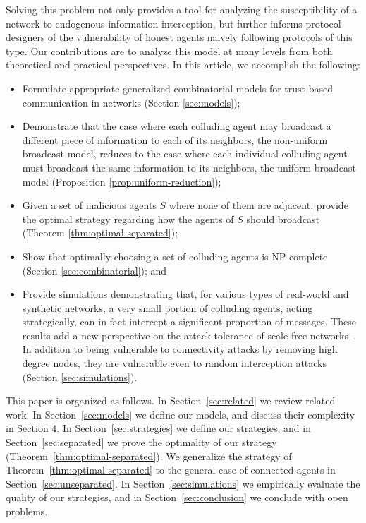 \documentclass{comnet}
\begin{document}
Solving this problem not only provides a tool for analyzing the susceptibility
of a network to endogenous information interception, but further informs
protocol designers of the vulnerability of honest agents naively following
protocols of this type. Our contributions are to analyze this model at many
levels from both theoretical and practical perspectives. In this article, we
accomplish the following:

\begin{itemize}
\item Formulate appropriate generalized combinatorial models for trust-based
communication in networks (Section \ref{sec:models});

\item Demonstrate that the case where each colluding agent may broadcast a
different piece of information to each of its neighbors, the non-uniform
broadcast model, reduces to the case where each individual colluding agent must
broadcast the same information to its neighbors, the uniform broadcast model
(Proposition \ref{prop:uniform-reduction});

\item Given a set of malicious agents $S$ where none of them are adjacent,
provide the optimal strategy regarding how the agents of $S$ should broadcast
(Theorem \ref{thm:optimal-separated});

\item Show that optimally choosing a set of colluding agents is NP-complete
(Section \ref{sec:combinatorial}); and 

\item Provide simulations demonstrating that, for various types of real-world
and synthetic networks, a very small portion of colluding agents, acting
strategically,  can in fact intercept a significant proportion of messages.
These results add a new perspective on the attack tolerance of scale-free
networks~\cite{AlbertJB00}. In addition to being vulnerable to connectivity
attacks by removing high degree nodes, they are vulnerable even to random
interception attacks (Section \ref{sec:simulations}).

\end{itemize} 

This paper is organized as follows. In Section~\ref{sec:related} we review
related work. In Section~\ref{sec:models} we define our models, and discuss
their complexity in Section 4. In Section~\ref{sec:strategies} we define our
strategies, and in Section~\ref{sec:separated} we prove the optimality of our
strategy (Theorem~\ref{thm:optimal-separated}). We generalize the strategy of
Theorem~\ref{thm:optimal-separated} to the general case of connected agents in
Section~\ref{sec:unseparated}. In Section~\ref{sec:simulations} we empirically
evaluate the quality of our strategies, and in Section~\ref{sec:conclusion} we
conclude with open problems.
\end{document}
